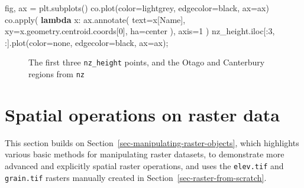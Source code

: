 \documentclass[
  letterpaper,
]{krantz}
\newenvironment{Shaded}{\begin{snugshade}}{\end{snugshade}}
\newcommand{\BuiltInTok}[1]{\textcolor[rgb]{0.00,0.23,0.31}{#1}}
\newcommand{\DecValTok}[1]{\textcolor[rgb]{0.68,0.00,0.00}{#1}}
\newcommand{\KeywordTok}[1]{\textcolor[rgb]{0.00,0.23,0.31}{\textbf{#1}}}
\newcommand{\NormalTok}[1]{\textcolor[rgb]{0.00,0.23,0.31}{#1}}
\newcommand{\OperatorTok}[1]{\textcolor[rgb]{0.37,0.37,0.37}{#1}}
\newcommand{\StringTok}[1]{\textcolor[rgb]{0.13,0.47,0.30}{#1}}
\begin{document}
\begin{Shaded}
\begin{Highlighting}[]
\NormalTok{fig, ax }\OperatorTok{=}\NormalTok{ plt.subplots()}
\NormalTok{co.plot(color}\OperatorTok{=}\StringTok{\textquotesingle{}lightgrey\textquotesingle{}}\NormalTok{, edgecolor}\OperatorTok{=}\StringTok{\textquotesingle{}black\textquotesingle{}}\NormalTok{, ax}\OperatorTok{=}\NormalTok{ax)}
\NormalTok{co.}\BuiltInTok{apply}\NormalTok{(}
    \KeywordTok{lambda}\NormalTok{ x: ax.annotate(}
\NormalTok{        text}\OperatorTok{=}\NormalTok{x[}\StringTok{\textquotesingle{}Name\textquotesingle{}}\NormalTok{], }
\NormalTok{        xy}\OperatorTok{=}\NormalTok{x.geometry.centroid.coords[}\DecValTok{0}\NormalTok{], }
\NormalTok{        ha}\OperatorTok{=}\StringTok{\textquotesingle{}center\textquotesingle{}}
\NormalTok{    ), }
\NormalTok{    axis}\OperatorTok{=}\DecValTok{1}
\NormalTok{)}
\NormalTok{nz\_height.iloc[:}\DecValTok{3}\NormalTok{, :].plot(color}\OperatorTok{=}\StringTok{\textquotesingle{}none\textquotesingle{}}\NormalTok{, edgecolor}\OperatorTok{=}\StringTok{\textquotesingle{}black\textquotesingle{}}\NormalTok{, ax}\OperatorTok{=}\NormalTok{ax)}\OperatorTok{;}
\end{Highlighting}
\end{Shaded}

\begin{figure}[H]


\caption{\label{fig-nz-height-and-otago}The first three
\texttt{nz\_height} points, and the Otago and Canterbury regions from
\texttt{nz}}

\end{figure}%

\section{Spatial operations on raster data}\label{sec-spatial-ras}

This section builds on Section~\ref{sec-manipulating-raster-objects},
which highlights various basic methods for manipulating raster datasets,
to demonstrate more advanced and explicitly spatial raster operations,
and uses the \texttt{elev.tif} and \texttt{grain.tif} rasters manually
created in Section~\ref{sec-raster-from-scratch}.
\end{document}
